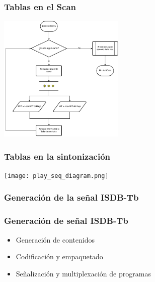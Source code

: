\documentclass[a4paper,11pt]{beamer}
\begin{document}
			\begin{frame}
				\frametitle{Tablas en el Scan}
					\begin{center}
						\includegraphics[width=6cm]{scan_seq_diag.png}
					\end{center}
			\end{frame}

			\begin{frame}
				\frametitle{Tablas en la sintonización}
					\begin{center}
						\texttt{[image: play\_seq\_diagram.png]}
					\end{center}
			\end{frame}
			
		\subsubsection{Generación de la señal ISDB-Tb}

			\begin{frame}
				\frametitle{Generación de señal ISDB-Tb}
				\begin{itemize}
					\item Generación de contenidos
					\item Codificación y empaquetado
					\item Señalización y multiplexación de programas
				\end{itemize}
			\end{frame}
\end{document}
